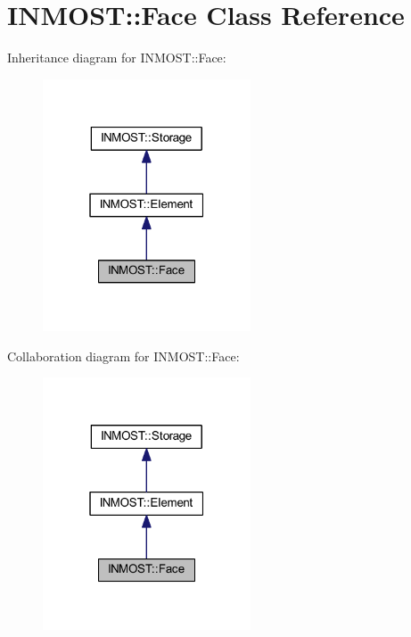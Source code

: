 \hypertarget{classINMOST_1_1Face}{\section{I\-N\-M\-O\-S\-T\-:\-:Face Class Reference}
\label{classINMOST_1_1Face}
}


Inheritance diagram for I\-N\-M\-O\-S\-T\-:\-:Face\-:
\nopagebreak
\begin{figure}[H]
\begin{center}
\leavevmode
\includegraphics[width=175pt]{classINMOST_1_1Face__inherit__graph}
\end{center}
\end{figure}


Collaboration diagram for I\-N\-M\-O\-S\-T\-:\-:Face\-:
\nopagebreak
\begin{figure}[H]
\begin{center}
\leavevmode
\includegraphics[width=175pt]{classINMOST_1_1Face__coll__graph}
\end{center}
\end{figure}
